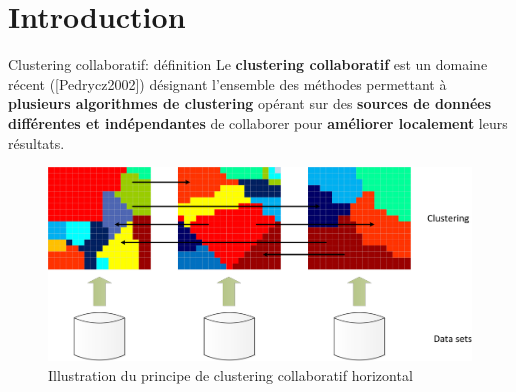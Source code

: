 \documentclass[hyperref={pdfpagelabels=false}]{beamer}
\begin{document}
    \section{Introduction}
    \begin{frame}{Clustering collaboratif: définition}
        Le \textbf{clustering collaboratif} est un domaine récent
        ([Pedrycz2002]) désignant l'ensemble des méthodes permettant à
        \textbf{plusieurs algorithmes de clustering} opérant sur des
        \textbf{sources de données différentes et indépendantes} de collaborer
        pour \textbf{améliorer localement} leurs résultats.

        \begin{figure}[b]
            \centering
            \includegraphics[scale=0.02]{hcc-min}
            \caption{Illustration du principe de clustering collaboratif 
            horizontal}
        \end{figure}
    \end{frame}
\end{document}
